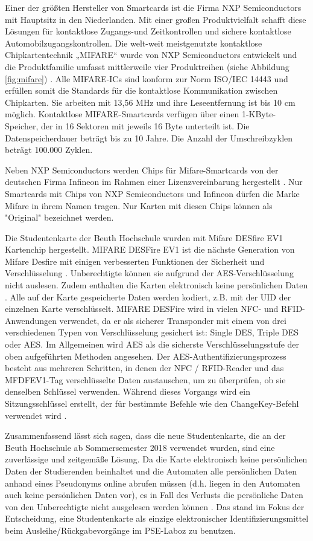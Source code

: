 Einer der größten Hersteller von Smartcards ist die Firma NXP Semiconductors mit Hauptsitz in den Niederlanden. Mit einer großen Produktvielfalt schafft diese Lösungen für kontaktlose Zugangs-und Zeitkontrollen und sichere kontaktlose Automobilzugangskontrollen. Die welt-weit meistgenutzte kontaktlose Chipkartentechnik „MIFARE“ wurde von NXP Semiconductors entwickelt und die Produktfamilie umfasst mittlerweile vier Produktreihen (siehe Abbildung \ref{fig:mifare}) \cite{website:9}. Alle MIFARE-ICs sind konform zur Norm ISO/IEC 14443 und erfüllen somit die Standards für die kontaktlose Kommunikation zwischen Chipkarten. Sie arbeiten mit 13,56 MHz und ihre Leseentfernung ist bis 10 cm möglich. Kontaktlose MIFARE-Smartcards verfügen über einen 1-KByte-Speicher, der in 16 Sektoren mit jeweils 16 Byte unterteilt ist. Die Datenspeicherdauer beträgt bis zu 10 Jahre. Die Anzahl der Umschreibzyklen beträgt 100.000 Zyklen.

Neben NXP Semiconductors werden Chips für Mifare-Smartcards von der deutschen Firma Infineon im Rahmen einer Lizenzvereinbarung hergestellt \cite{website:11}. Nur Smartcards mit Chips von NXP Semiconductors und Infineon dürfen die Marke Mifare in ihrem Namen tragen. Nur Karten mit diesen Chips können als "Original" bezeichnet werden.

Die Studentenkarte der Beuth Hochschule wurden mit Mifare DESfire EV1 Kartenchip hergestellt. MIFARE DESFire EV1 ist die nächste Generation von Mifare Desfire mit einigen verbesserten Funktionen der Sicherheit und Verschlüsselung \cite[p.83]{chirico:smart_card}. Unberechtigte können sie aufgrund der AES-Verschlüsselung nicht auslesen. Zudem enthalten die Karten elektronisch keine persönlichen Daten \cite{website:12}. Alle auf der Karte gespeicherte Daten werden kodiert, z.B. mit der UID der einzelnen Karte verschlüsselt. MIFARE DESFire wird in vielen NFC- und RFID-Anwendungen verwendet, da er als sicherer Transponder mit einem von drei verschiedenen Typen von Verschlüsselung gesichert ist: Single DES, Triple DES oder AES. Im Allgemeinen wird AES als die sicherste Verschlüsselungsstufe der oben aufgeführten Methoden angesehen. Der AES-Authentifizierungsprozess besteht aus mehreren Schritten, in denen der NFC / RFID-Reader und das MFDFEV1-Tag verschlüsselte Daten austauschen, um zu überprüfen, ob sie denselben Schlüssel verwenden. Während dieses Vorgangs wird ein Sitzungsschlüssel erstellt, der für bestimmte Befehle wie den ChangeKey-Befehl verwendet wird \cite{website:10}.

Zusammenfassend lässt sich sagen, dass die neue Studentenkarte, die an der Beuth Hochschule ab Sommersemester 2018 verwendet wurden, sind eine zuverlässige und zeitgemäße Lösung. Da die Karte elektronisch keine persönlichen Daten der Studierenden beinhaltet und die Automaten alle persönlichen Daten anhand eines Pseudonyms online abrufen müssen (d.h. liegen in den Automaten auch keine persönlichen Daten vor), es in Fall des Verlusts die persönliche Daten von den Unberechtigte nicht ausgelesen werden können \cite{website:12}. Das stand im Fokus der Entscheidung, eine Studentenkarte als einzige elektronischer Identifizierungsmittel beim Ausleihe/Rückgabevorgänge im PSE-Laboz zu benutzen.

